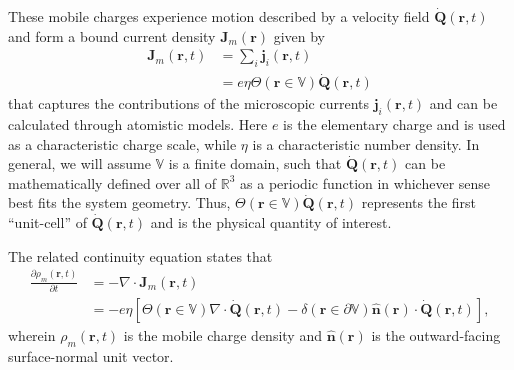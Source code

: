 \documentclass{article}
\begin{document}

These mobile charges experience motion described by a velocity field $\dot{\mathbf{Q}}(\mathbf{r},t)$ and form a bound current density $\mathbf{J}_m(\mathbf{r})$ given by
\begin{equation}
\begin{split}
\mathbf{J}_m(\mathbf{r},t) &= \sum_i\mathbf{j}_i(\mathbf{r},t)\\
&= e\eta\Theta(\mathbf{r}\in\mathbb{V})\dot{\mathbf{Q}}(\mathbf{r},t)
\end{split}
\end{equation}
that captures the contributions of the microscopic currents $\mathbf{j}_i(\mathbf{r},t)$ and can be calculated through atomistic models. Here $e$ is the elementary charge and is used as a characteristic charge scale, while $\eta$ is a characteristic number density. In general, we will assume $\mathbb{V}$ is a finite domain, such that $\dot{\mathbf{Q}}(\mathbf{r},t)$ can be mathematically defined over all of $\mathbb{R}^3$ as a periodic function in whichever sense best fits the system geometry. Thus, $\Theta(\mathbf{r}\in\mathbb{V})\dot{\mathbf{Q}}(\mathbf{r},t)$ represents the first ``unit-cell'' of $\dot{\mathbf{Q}}(\mathbf{r},t)$ and is the physical quantity of interest. 


The related continuity equation states that
\begin{equation}
\begin{split}
\frac{\partial \rho_m(\mathbf{r},t)}{\partial t} 
&= -\nabla\cdot\mathbf{J}_m(\mathbf{r},t)\\
&= -e\eta\left[\Theta(\mathbf{r}\in\mathbb{V})\nabla\cdot\dot{\mathbf{Q}}(\mathbf{r},t) - \delta(\mathbf{r}\in\partial\mathbb{V})\hat{\mathbf{n}}(\mathbf{r})\cdot\dot{\mathbf{Q}}(\mathbf{r},t)\right],
\end{split}
\end{equation}
wherein $\rho_m(\mathbf{r},t)$ is the mobile charge density and $\hat{\mathbf{n}}(\mathbf{r})$ is the outward-facing surface-normal unit vector.
\end{document}
